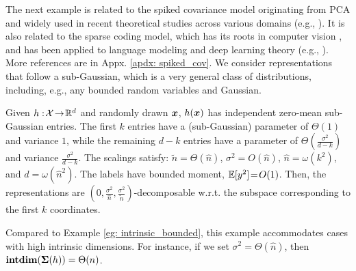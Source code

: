 {The next example is related to the spiked covariance model originating from PCA and widely used in recent theoretical studies across various domains (e.g., \cite{muthukumar2021classification,nakada2023understanding}). It is also related to the sparse coding model, which has its roots in computer vision \cite{olshausen1997sparse}, and has been applied to language modeling \cite{arora2018linear} and deep learning theory (e.g., \cite{allen2020towards}). More references are in Appx. \ref{apdx: spiked_cov}. We consider representations that follow a sub-Gaussian, which is a very general class of distributions, including, e.g., any bounded random variables and Gaussian.} 
\begin{example}\label{eg: spiked_cov}
Given $h:\!{\mathcal{X}}\!\rightarrow\! {\mathbb{R}}^d $ and randomly drawn ${\bm{x}}$, 
$h({\bm{x}})$ has independent zero-mean sub-Gaussian entries. 
The first $k$ entries have a (sub-Gaussian) parameter of $\Theta(1)$ and variance $1$, while the remaining $d\!-\!k$ entries have a parameter of $\Theta(\frac{\sigma^2}{d-k})$ and variance $\frac{\sigma^2}{d-k}$. The scalings satisfy: $\tilde{n} \!= \!\Theta(\hat{n})$, $\sigma^2 = O(\hat{n})$, $\hat{n}\! = \!\omega(k^2)$, and $d \! =\! \omega(\hat{n}^2)$. The labels have bounded moment, $\mathbb{E}[y^2] \!= \!O(1)$. Then, the representations are $(0, \frac{\sigma^2}{\hat{n}}, \frac{\sigma^2}{\tilde{n}})$-decomposable w.r.t. the subspace corresponding to the first $k$ coordinates.
\end{example}
\begin{remark}
Compared to Example \ref{eg: intrinsic_bounded}, this example accommodates cases with high intrinsic dimensions. For instance, if we set $\sigma^2 = \Theta(\hat{n})$, then $\textbf{intdim}({\bm{\Sigma}}(h)) = \Theta(n)$. 
\end{remark}
